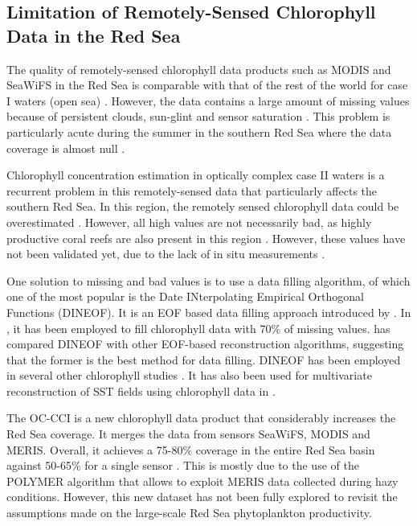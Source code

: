 \subsection{Limitation of Remotely-Sensed Chlorophyll Data in the Red Sea}

The quality of remotely-sensed chlorophyll data products such as MODIS and
SeaWiFS in the Red Sea is comparable with that of the rest of the world for
case I waters (open sea) \citep{Brewin2013}. However, the data contains a large
amount of missing values because of persistent clouds, sun-glint and sensor
saturation \citep{Racault}. This problem is particularly acute during the
summer in the southern Red Sea where the data coverage is almost null
\citep{Racault}.

Chlorophyll concentration estimation in optically complex case II waters is a
recurrent problem in this remotely-sensed data that particularly affects the
southern Red Sea.  In this region, the remotely sensed chlorophyll data could
be overestimated \citep{Raitsos2013}. However, all high values are not
necessarily bad, as highly productive coral reefs are also present in this
region \citep{Raitsos2013}.  However, these values have not been validated yet,
due to the lack of in situ measurements \citep{Raitsos2013}.

One solution to missing and bad values is to use a data filling algorithm, of
which one of the most popular is the Date INterpolating Empirical Orthogonal
Functions (DINEOF). It is an EOF based data filling approach introduced by
\citet{Beckers2003}. In \citet{Sicarjobs2011}, it has been employed to fill
chlorophyll data with 70\% of missing values.  \citet{Taylor2013} has compared
DINEOF with other EOF-based reconstruction algorithms, suggesting that the
former is the best method for data filling.  DINEOF has been employed in
several other chlorophyll studies \citep{Miles2010, Waite2013}. It has also
been used for multivariate reconstruction of SST fields using chlorophyll data
in \citet{Alvera2007}. 

The OC-CCI is a new chlorophyll data product that considerably increases the
Red Sea coverage. It merges the data from sensors SeaWiFS, MODIS and MERIS.
Overall, it achieves a 75-80\% coverage in the entire Red Sea basin against
50-65\% for a single sensor \citep{Racault}. This is mostly due to the use of
the POLYMER algorithm \citep{Steinmetz2011} that allows to exploit MERIS data
collected during hazy conditions. However, this new dataset has not been fully
explored to revisit the assumptions made on the large-scale Red Sea
phytoplankton productivity.

